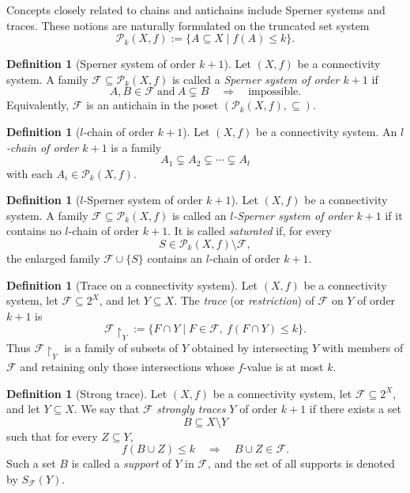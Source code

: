 \documentclass[10pt]{book}
\theoremstyle{definition}
\newtheorem{definition}[theorem]{Definition}
\begin{document}
Concepts closely related to chains and antichains include Sperner systems and traces.  
These notions are naturally formulated on the truncated set system
\[
\mathcal{P}_k(X,f):=\{A\subseteq X \mid f(A)\leq k\}.
\]

\begin{definition}[Sperner system of order \(k+1\)]
Let \((X,f)\) be a connectivity system.
A family \(\mathcal{F}\subseteq \mathcal{P}_k(X,f)\) is called a \emph{Sperner system of order \(k+1\)} if
\[
A,B\in \mathcal{F}\ \text{and}\ A\subsetneq B
\quad\Longrightarrow\quad \text{impossible}.
\]
Equivalently, \(\mathcal{F}\) is an antichain in the poset \((\mathcal{P}_k(X,f),\subseteq)\).
\end{definition}

\begin{definition}[\(l\)-chain of order \(k+1\)]
Let \((X,f)\) be a connectivity system.
An \emph{\(l\)-chain of order \(k+1\)} is a family
\[
A_1 \subsetneq A_2 \subsetneq \cdots \subsetneq A_l
\]
with each \(A_i\in \mathcal{P}_k(X,f)\).
\end{definition}

\begin{definition}[\(l\)-Sperner system of order \(k+1\)]
Let \((X,f)\) be a connectivity system.
A family \(\mathcal{F}\subseteq \mathcal{P}_k(X,f)\) is called an \emph{\(l\)-Sperner system of order \(k+1\)} if it contains no \(l\)-chain of order \(k+1\).
It is called \emph{saturated} if, for every
\[
S\in \mathcal{P}_k(X,f)\setminus \mathcal{F},
\]
the enlarged family \(\mathcal{F}\cup\{S\}\) contains an \(l\)-chain of order \(k+1\).
\end{definition}

\begin{definition}[Trace on a connectivity system]
\label{def:trace_connectivity}
Let \((X,f)\) be a connectivity system, let \(\mathcal{F}\subseteq 2^X\), and let \(Y\subseteq X\).
The \emph{trace} (or \emph{restriction}) of \(\mathcal{F}\) on \(Y\) of order \(k+1\) is
\[
\mathcal{F}\!\restriction_Y
:=
\{F\cap Y \mid F\in \mathcal{F},\ f(F\cap Y)\leq k\}.
\]
Thus \(\mathcal{F}\!\restriction_Y\) is a family of subsets of \(Y\) obtained by intersecting \(Y\) with members of \(\mathcal{F}\) and retaining only those intersections whose \(f\)-value is at most \(k\).
\end{definition}

\begin{definition}[Strong trace]
\label{def:strong_trace_connectivity}
Let \((X,f)\) be a connectivity system, let \(\mathcal{F}\subseteq 2^X\), and let \(Y\subseteq X\).
We say that \(\mathcal{F}\) \emph{strongly traces} \(Y\) of order \(k+1\) if there exists a set
\[
B\subseteq X\setminus Y
\]
such that for every \(Z\subseteq Y\),
\[
f(B\cup Z)\leq k
\quad\Longrightarrow\quad
B\cup Z \in \mathcal{F}.
\]
Such a set \(B\) is called a \emph{support} of \(Y\) in \(\mathcal{F}\), and the set of all supports is denoted by \(S_{\mathcal{F}}(Y)\).
\end{definition}
\end{document}

